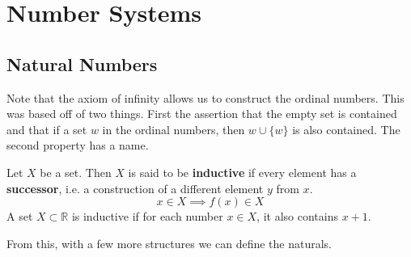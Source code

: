 \section{Number Systems} 

\subsection{Natural Numbers}

  Note that the axiom of infinity allows us to construct the ordinal numbers. This was based off of two things. First the assertion that the empty set is contained and that if a set $w$ in the ordinal numbers, then $w \cup \{w\}$ is also contained. The second property has a name. 

  \begin{definition} 
    Let $X$ be a set. Then $X$ is said to be \textbf{inductive} if every element has a \textbf{successor}, i.e. a construction of a different element $y$ from $x$.  
    \begin{equation}
      x \in X \implies f(x) \in X
    \end{equation}
    A set 
    $X \subset \mathbb{R}$ is inductive if for each number $x \in X$, it also contains $x + 1$. 
  \end{definition} 

  From this, with a few more structures we can define the naturals. 

